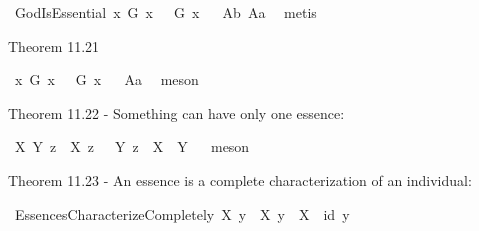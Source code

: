 \begin{isabellebody}
\begin{isamarkuptext}
\end{isamarkuptext}\isamarkuptrue%
\isamarkupfalse%
\ GodIsEssential{\isacharcolon}\ {\isachardoublequoteopen}{\isasymlfloor}\isactrlbold {\isasymforall}x{\isachardot}\ G\ x\ \isactrlbold {\isasymrightarrow}\ {\isacharparenleft}{\isasymE}\ G\ x{\isacharparenright}{\isasymrfloor}{\isachardoublequoteclose}%
\isadelimproof
\ %
\endisadelimproof
%
\isatagproof
{}\isamarkupfalse%
\ A{}b\ A{}a\ \isamarkupfalse%
\ metis%
\endisatagproof
{\isafoldproof}%
%
\isadelimproof
%
\endisadelimproof
%
\begin{isamarkuptext}%
Theorem 11.21%
\end{isamarkuptext}\isamarkuptrue%
\isamarkupfalse%
\ {\isachardoublequoteopen}{\isasymlfloor}\isactrlbold {\isasymforall}x{\isachardot}\ G{\isacharasterisk}\ x\ \isactrlbold {\isasymrightarrow}\ {\isacharparenleft}{\isasymE}\ G{\isacharasterisk}\ x{\isacharparenright}{\isasymrfloor}{\isachardoublequoteclose}%
\isadelimproof
\ %
\endisadelimproof
%
\isatagproof
{}\isamarkupfalse%
\ A{}a\ \isamarkupfalse%
\ meson%
\endisatagproof
{\isafoldproof}%
%
\isadelimproof
%
\endisadelimproof
%
\begin{isamarkuptext}%
Theorem 11.22 - Something can have only one essence:%
\end{isamarkuptext}\isamarkuptrue%
\isamarkupfalse%
\ {\isachardoublequoteopen}{\isasymlfloor}\isactrlbold {\isasymforall}X\ Y\ z{\isachardot}\ {\isacharparenleft}{\isasymE}\ X\ z\ \isactrlbold {\isasymand}\ {\isasymE}\ Y\ z{\isacharparenright}\ \isactrlbold {\isasymrightarrow}\ {\isacharparenleft}X\ {\isasymRrightarrow}\ Y{\isacharparenright}{\isasymrfloor}{\isachardoublequoteclose}%
\isadelimproof
\ %
\endisadelimproof
%
\isatagproof
{}\isamarkupfalse%
\ meson%
\endisatagproof
{\isafoldproof}%
%
\isadelimproof
%
\endisadelimproof
%
\begin{isamarkuptext}%
Theorem 11.23 - An essence is a complete characterization of an individual:%
\end{isamarkuptext}\isamarkuptrue%
\isamarkupfalse%
\ EssencesCharacterizeCompletely{\isacharcolon}\ {\isachardoublequoteopen}{\isasymlfloor}\isactrlbold {\isasymforall}X\ y{\isachardot}\ {\isasymE}\ X\ y\ \isactrlbold {\isasymrightarrow}\ {\isacharparenleft}X\ {\isasymRrightarrow}\ {\isacharparenleft}id\ y{\isacharparenright}{\isacharparenright}{\isasymrfloor}{\isachardoublequoteclose}\isanewline

\end{isabellebody}
